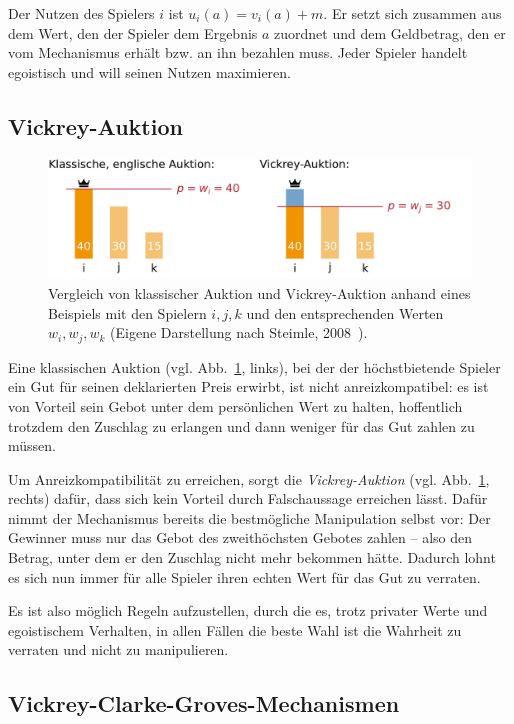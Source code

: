 \documentclass[a4paper,11pt]{article}
\theoremstyle{definition}
\theoremstyle{plain}
\theoremstyle{definition}
\begin{document}
Der Nutzen des Spielers $i$ ist $u_i(a) = v_i(a) + m$. Er setzt sich zusammen aus dem Wert, den der Spieler dem Ergebnis $a$ zuordnet und dem Geldbetrag, den er vom Mechanismus erhält bzw. an ihn bezahlen muss. Jeder Spieler handelt egoistisch und will seinen Nutzen maximieren.

\subsection{Vickrey-Auktion}
\begin{figure}
	\centering
	\includegraphics[width=\textwidth]{img/vickrey-auktion.pdf}
	\caption{Vergleich von klassischer Auktion und Vickrey-Auktion anhand eines Beispiels mit den Spielern $i,j,k$ und den entsprechenden Werten $w_i,w_j,w_k$ (Eigene Darstellung nach Steimle, 2008~\cite{ste08}).}
	\label{fig:vickAukt}
\end{figure}

Eine klassischen Auktion (vgl. Abb.~\ref{fig:vickAukt}, links), bei der der höchstbietende Spieler ein Gut für seinen deklarierten Preis erwirbt, ist nicht anreizkompatibel: es ist von Vorteil sein Gebot unter dem persönlichen Wert zu halten, hoffentlich trotzdem den Zuschlag zu erlangen und dann weniger für das Gut zahlen zu müssen.

Um Anreizkompatibilität zu erreichen, sorgt die \emph{Vickrey-Auktion} (vgl. Abb.~\ref{fig:vickAukt}, rechts) dafür, dass sich kein Vorteil durch Falschaussage erreichen lässt. Dafür nimmt der Mechanismus bereits die bestmögliche Manipulation selbst vor: Der Gewinner muss nur das Gebot des zweithöchsten Gebotes zahlen -- also den Betrag, unter dem er den Zuschlag nicht mehr bekommen hätte. Dadurch lohnt es sich nun immer für alle Spieler ihren echten Wert für das Gut zu verraten.

Es ist also möglich Regeln aufzustellen, durch die es, trotz privater Werte und egoistischem Verhalten, in allen Fällen die beste Wahl ist die Wahrheit zu verraten und nicht zu manipulieren.

\subsection{Vickrey-Clarke-Groves-Mechanismen}
\end{document}
